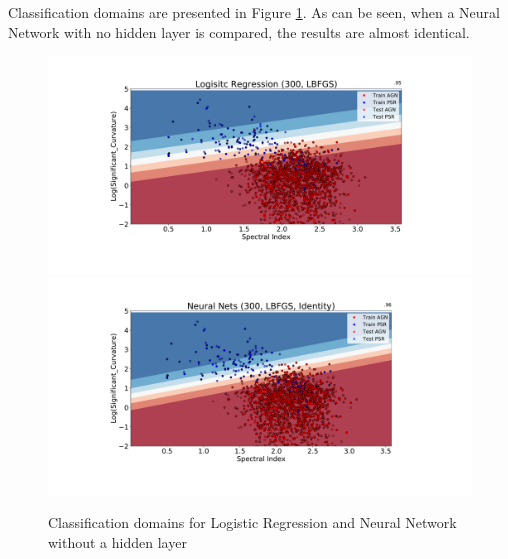 Classification domains are presented in Figure \ref{fig:LR_domains}. As can be seen, when a Neural Network with no hidden layer is compared, the results are almost identical. \\

\begin{figure}[h]
\includegraphics[width=\twopicsp\textwidth]{plots/classification_domains/LR_300_LBFGS_noweight.pdf}
\includegraphics[width=\twopicsp\textwidth]{plots/classification_domains/NN_300_LBFGS_Identity.pdf}
\caption{Classification domains for Logistic Regression and Neural Network without a hidden layer
}
\label{fig:LR_domains}
\end{figure}


